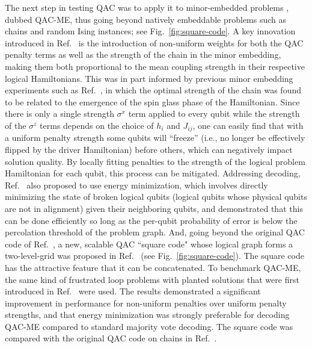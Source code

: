 The next step in testing QAC was to apply it to minor-embedded problems \cite{Vinci:2015jt}, dubbed QAC-ME, thus going beyond natively embeddable problems such as chains and random Ising instances; see Fig.~\ref{fig:square-code}. A key innovation introduced in Ref.~\cite{Vinci:2015jt} is the introduction of non-uniform weights for both the QAC penalty terms as well as the strength of the chain in the minor embedding, making them both proportional to the mean coupling strength in their respective logical Hamiltonians. This was in part informed by previous minor embedding experiments such as Ref.~\cite{Venturelli:2014nx}, in which the optimal strength of the chain was found to be related to the emergence of the spin glass phase of the Hamiltonian. Since there is only a single strength $\sigma^x$ term applied to every qubit while the strength of the $\sigma^z$ terms depends on the choice of $h_i$ and $J_{ij}$, one can easily find that with a uniform penalty strength some qubits will ``freeze'' (i.e., no longer be effectively flipped by the driver Hamiltonian) before others, which can negatively impact solution quality. By locally fitting penalties to the strength of the logical problem Hamiltonian for each qubit, this process can be mitigated. Addressing decoding, Ref.~\cite{Vinci:2015jt} also proposed to use energy minimization, which involves directly minimizing the state of broken logical qubits (logical qubits whose physical qubits are not in alignment) given their neighboring qubits, and demonstrated that this can be done efficiently so long as the per-qubit probability of error is below the percolation threshold of the problem graph. And, going beyond the original QAC code of Ref.~\cite{PAL:13}, a new, scalable QAC ``square code" whose logical graph forms a two-level-grid was proposed in Ref.~\cite{Vinci:2015jt} (see Fig.~\ref{fig:square-code}). The square code has the attractive feature that it can be concatenated. To benchmark QAC-ME, the same kind of frustrated loop problems with planted solutions that were first introduced in Ref.~\cite{Hen:2015rt} were used. The results demonstrated a significant improvement in performance for non-uniform penalties over uniform penalty strengths, and that energy minimization was strongly preferable for decoding QAC-ME compared to standard majority vote decoding. The square code was compared with the original QAC code on chains in Ref.~\cite{Mishra:2015}.

